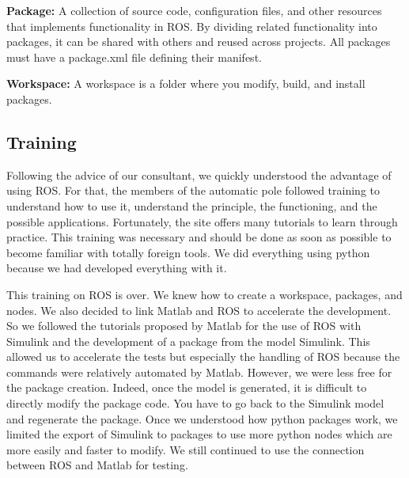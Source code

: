 \bigbreak
\textbf{Package:} A collection of source code, configuration files, and other resources that implements functionality in ROS. By dividing related functionality into packages, it can be shared with others and reused across projects. All packages must have a package.xml file defining their manifest.

\bigbreak
\textbf{Workspace:} A workspace is a folder where you modify, build, and install packages.

\subsection{Training}

Following the advice of our consultant, we quickly understood the advantage of using ROS. For that, the members of the automatic pole followed training to understand how to use it, understand the principle, the functioning, and the possible applications. Fortunately, the site offers many tutorials to learn through practice. This training was necessary and should be done as soon as possible to become familiar with totally foreign tools. We did everything using python because we had developed everything with it. 

\bigbreak
This training on ROS is over. We knew how to create a workspace, packages, and nodes. We also decided to link Matlab and ROS to accelerate the development. So we followed the tutorials proposed by Matlab for the use of ROS with Simulink and the development of a package from the model Simulink. This allowed us to accelerate the tests but especially the handling of ROS because the commands were relatively automated by Matlab. However, we were less free for the package creation. Indeed, once the model is generated, it is difficult to directly modify the package code. You have to go back to the Simulink model and regenerate the package. Once we understood how python packages work, we limited the export of Simulink to packages to use more python nodes which are more easily and faster to modify. We still continued to use the connection between ROS and Matlab for testing.

